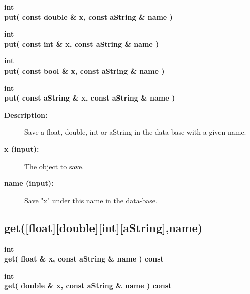  
\begin{flushleft} \textbf{%
int  \\ 
\settowidth{\GenericDataBaseIncludeArgIndent}{put(}%
put( const double \& x, const aString \& name ) 
}\end{flushleft}
    

 
\begin{flushleft} \textbf{%
int  \\ 
\settowidth{\GenericDataBaseIncludeArgIndent}{put(}%
put( const int \& x, const aString \& name )
}\end{flushleft}
    

 
\begin{flushleft} \textbf{%
int  \\ 
\settowidth{\GenericDataBaseIncludeArgIndent}{put(}%
put( const bool \& x, const aString \& name )
}\end{flushleft}
    

 
\begin{flushleft} \textbf{%
int  \\ 
\settowidth{\GenericDataBaseIncludeArgIndent}{put(}%
put( const aString \& x, const aString \& name ) 
}\end{flushleft}
\begin{description}
\item[{\bf Description:}]  Save a float, double, int or aString in the data-base with a given name.

\item[{\bf x (input):}]  The object to save.
\item[{\bf name (input):}]  Save "x" under this name in the data-base.
    
\end{description}
\subsection{get([float][double][int][aString],name) }
 
\begin{flushleft} \textbf{%
int  \\ 
\settowidth{\GenericDataBaseIncludeArgIndent}{get(}%
get( float \& x, const aString \& name ) const
}\end{flushleft}
    

 
\begin{flushleft} \textbf{%
int  \\ 
\settowidth{\GenericDataBaseIncludeArgIndent}{get(}%
get( double \& x, const aString \& name ) const
}\end{flushleft}
    

